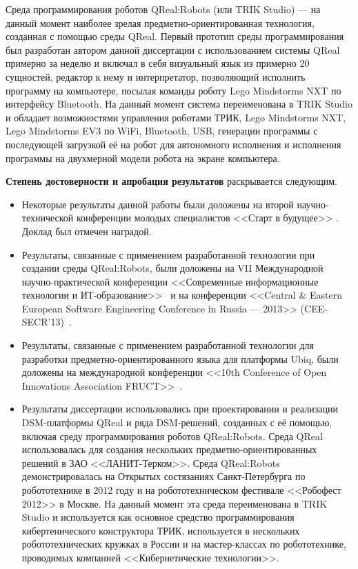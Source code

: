 Среда программирования роботов QReal:Robots (или TRIK Studio) --- на данный момент наиболее зрелая 
предметно-ориентированная технология, созданная с помощью среды QReal. 
Первый прототип среды программирования был разработан автором данной диссертации
с использованием системы QReal примерно за неделю и включал в себя визуальный 
язык из примерно 20 сущностей, редактор к нему и интерпретатор, позволяющий 
исполнить программу на компьютере, посылая команды роботу Lego Mindstorms NXT по интерфейсу 
Bluetooth. На данный момент система переименована в TRIK Studio и обладает возможностями управления роботами 
ТРИК, Lego Mindstorms NXT, Lego Mindstorms EV3 по WiFi, Bluetooth, USB, генерации программы с 
последующей загрузкой её на робот для автономного исполнения и исполнения 
программы на двухмерной модели робота на экране компьютера.

\textbf{Степень достоверности и апробация результатов} раскрывается следующим.
\begin{itemize}
	\item Некоторые результаты данной работы были доложены на второй 
		научно-технической конференции молодых специалистов <<Старт в будущее>> 
		\cite{kuzenkova2011metamodeling2}. Доклад был отмечен наградой.
	\item Результаты, связанные с применением разработанной технологии при 
		создании среды QReal:Robots, были доложены на VII Международной 
		научно-практической конференции <<Современные информационные технологии 
		и ИТ-образование>>~\cite{litvinov2012robots} и на конференции <<Central \& Eastern European
		Software Engineering Conference in Russia --- 2013>> (CEE-SECR'13)~\cite{terekhov2013secr}.
	\item Результаты, связанные с применением разработанной технологии для 
		разработки предметно-ориентированного языка для платформы Ubiq, были доложены 
		на международной конференции <<10th Conference of Open Innovations 
		Association FRUCT>>~\cite{bryksin2011ubiq}.
	\item Результаты диссертации использовались при проектировании и реализации 
		DSM-платформы QReal и ряда DSM-решений, созданных с её помощью, включая 
		среду программирования роботов QReal:Robots. Среда QReal использовалась для 
		создания нескольких предметно-ориентированных решений в ЗАО <<ЛАНИТ-Терком>>. 
		Среда QReal:Robots демонстрировалась на Открытых состязаниях 
		Санкт-Петербурга по робототехнике в 2012 году и на робототехническом 
		фестивале <<Робофест 2012>> в Москве. На данный момент эта среда переименована в 
		TRIK Studio и используется как основное средство программирования 
		кибертенического конструктора ТРИК, используется в нескольких робототехнических 
		кружках в России и на мастер-классах по робототехнике, проводимых компанией <<Кибернетические технологии>>.
\end{itemize}

